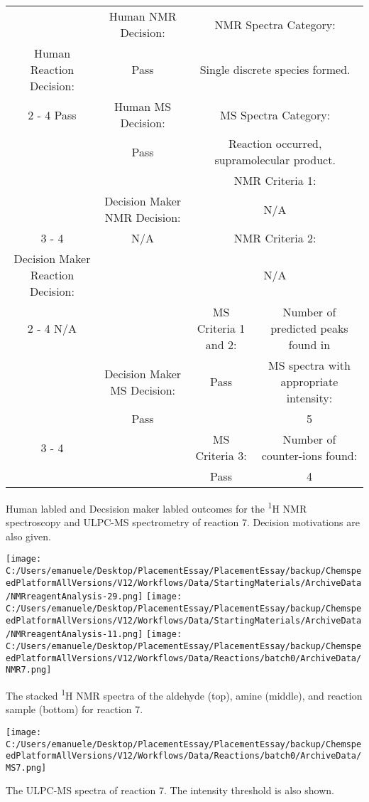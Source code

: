 \documentclass{article}%
\begin{document}
\begin{Decision Table}[H]%
\begin{tabular}{|c|c|c|c|}%
\hline%
&Human NMR Decision:&\multicolumn{2}{|c|}{NMR Spectra Category:}\\%
Human Reaction Decision:&Pass&\multicolumn{2}{|c|}{Single discrete species formed.}\\%
\cline{2%
-%
4}%
Pass&Human MS Decision:&\multicolumn{2}{|c|}{MS Spectra Category:}\\%
&Pass&\multicolumn{2}{|c|}{Reaction occurred, supramolecular product.}\\%
\hline%
&&\multicolumn{2}{|c|}{NMR Criteria 1:}\\%
&Decision Maker NMR Decision:&\multicolumn{2}{|c|}{N/A}\\%
\cline{3%
-%
4}%
&N/A&\multicolumn{2}{|c|}{NMR Criteria 2:}\\%
Decision Maker Reaction Decision:&&\multicolumn{2}{|c|}{N/A}\\%
\cline{2%
-%
4}%
N/A&&MS Criteria 1 and 2:&Number of predicted peaks found in\\%
&Decision Maker MS Decision:&Pass&MS spectra with appropriate intensity:\\%
&Pass&&5\\%
\cline{3%
-%
4}%
&&MS Criteria 3:&Number of counter{-}ions found:\\%
&&Pass&4\\%
\hline%
\end{tabular}%
\caption{Human labled and Decsision maker labled outcomes for the \textsuperscript{1}H NMR spectroscopy and ULPC-MS spectrometry of reaction 7. Decision motivations are also given.}%
\end{Decision Table}%
\begin{NMR Spectra}[H]%
\begin{center}%
\texttt{[image: C:/Users/emanuele/Desktop/PlacementEssay/PlacementEssay/backup/ChemspeedPlatformAllVersions/V12/Workflows/Data/StartingMaterials/ArchiveData/NMRreagentAnalysis-29.png]}\hfill%
\texttt{[image: C:/Users/emanuele/Desktop/PlacementEssay/PlacementEssay/backup/ChemspeedPlatformAllVersions/V12/Workflows/Data/StartingMaterials/ArchiveData/NMRreagentAnalysis-11.png]}\hfill%
\texttt{[image: C:/Users/emanuele/Desktop/PlacementEssay/PlacementEssay/backup/ChemspeedPlatformAllVersions/V12/Workflows/Data/Reactions/batch0/ArchiveData/NMR7.png]}\hfill%
\end{center}%
\caption{The stacked \textsuperscript{1}H NMR spectra of the aldehyde (top), amine (middle), and reaction sample (bottom) for reaction 7.}%
\end{NMR Spectra}%
\begin{MS Spectra}[H]%
\begin{center}%
\texttt{[image: C:/Users/emanuele/Desktop/PlacementEssay/PlacementEssay/backup/ChemspeedPlatformAllVersions/V12/Workflows/Data/Reactions/batch0/ArchiveData/MS7.png]}\hfill%
\end{center}%
\caption{The ULPC-MS spectra of reaction 7. The intensity threshold is also shown.}%
\end{MS Spectra}%
\end{document}
